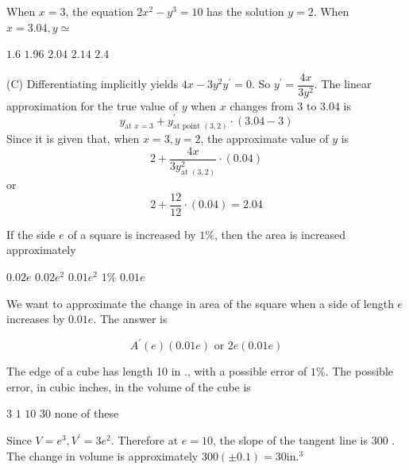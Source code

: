 \question
When $x=3$, the equation $2 x^{2}-y^{3}=10$ has the solution $y=2$. When $x=3.04, y \simeq$
\begin{choices}
  \choice $1.6$
  \choice $1.96$
  \CorrectChoice $2.04$
  \choice $2.14$
  \choice $2.4$
\end{choices}
\begin{solution}
(C) Differentiating implicitly yields $4 x-3 y^{2} y^{\prime}=0$. So $y^{\prime}=\dfrac{4 x}{3 y^{2}}$. The linear approximation for the true value of $y$ when $x$ changes from 3 to 3.04 is
\[
y_{\text {at } x=3}+y_{\text {at point }(3,2)}^{\prime} \cdot(3.04-3)
\]
Since it is given that, when $x=3, y=2$, the approximate value of $y$ is
\[
2+\dfrac{4 x}{3 y_{\text {at }(3,2)}^{2}} \cdot(0.04)
\]
or
\[
2+\dfrac{12}{12} \cdot(0.04)=2.04
\]
\end{solution}




\newpage



\question
If the side $e$ of a square is increased by $1 \%$, then the area is increased approximately
\begin{choices}
  \choice $0.02 e$
  \CorrectChoice $0.02 e^{2}$
  \choice $0.01 e^{2}$
  \choice $1 \%$
  \choice $0.01 e$
\end{choices}
\begin{solution}
We want to approximate the change in area of the square when a side of length $e$ increases by $0.01 e$. The answer is


\[
A^{\prime}(e)(0.01 e) \text { or } 2 e(0.01 e)
\]


  \setcounter{enumi}{10}
\end{solution}

\question
The edge of a cube has length 10 in ., with a possible error of $1 \%$. The possible error, in cubic inches, in the volume of the cube is
\begin{choices}
  \choice $3$
  \choice $1$
  \choice $10$
  \CorrectChoice $30$
  \choice none of these
\end{choices}
\begin{solution}
Since $V=e^{3}, V^{\prime}=3 e^{2}$. Therefore at $e=10$, the slope of the tangent line is 300 . The change in volume is approximately $300( \pm 0.1)=30 \mathrm{in} .^{3}$
\end{solution}





\newpage



